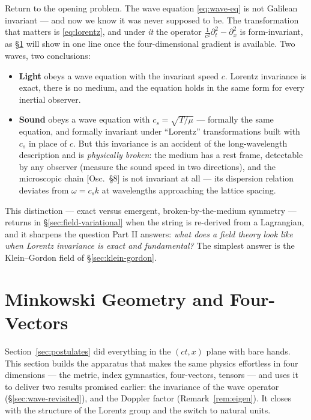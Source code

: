 \documentclass[11pt]{article}
\theoremstyle{plain}
\theoremstyle{definition}
\theoremstyle{remark}
\begin{document}
Return to the opening problem. The wave equation
\eqref{eq:wave-eq} is not Galilean invariant --- and now we know it was
never supposed to be. The transformation that matters is
\eqref{eq:lorentz}, and under \emph{it} the operator
$\frac{1}{c^2}\partial_t^2 - \partial_x^2$ is form-invariant, as
\S\ref{sec:minkowski} will show in one line once the four-dimensional
gradient is available. Two waves, two conclusions:

\begin{itemize}
  \item \textbf{Light} obeys a wave equation with the invariant speed
  $c$. Lorentz invariance is exact, there is no medium, and the equation
  holds in the same form for every inertial observer.
  \item \textbf{Sound} obeys a wave equation with $c_s = \sqrt{T/\mu}$
  --- formally the same equation, and formally invariant under
  ``Lorentz'' transformations built with $c_s$ in place of $c$. But this
  invariance is an accident of the long-wavelength description and is
  \emph{physically broken}: the medium has a rest frame, detectable by
  any observer (measure the sound speed in two directions), and the
  microscopic chain [Osc.\ \S8] is not invariant at all --- its
  dispersion relation deviates from $\omega = c_s k$ at wavelengths
  approaching the lattice spacing.
\end{itemize}

\noindent
This distinction --- exact versus emergent, broken-by-the-medium symmetry
--- returns in \S\ref{sec:field-variational} when the string is
re-derived from a Lagrangian, and it sharpens the question Part II
answers: \emph{what does a field theory look like when Lorentz invariance
is exact and fundamental?} The simplest answer is the
Klein--Gordon field of \S\ref{sec:klein-gordon}.

\section{Minkowski Geometry and Four-Vectors}
\label{sec:minkowski}

Section~\ref{sec:postulates} did everything in the $(ct, x)$ plane with
bare hands. This section builds the apparatus that makes the same
physics effortless in four dimensions --- the metric, index gymnastics,
four-vectors, tensors --- and uses it to deliver two results promised
earlier: the invariance
of the wave operator (\S\ref{sec:wave-revisited}), and the
Doppler factor (Remark~\ref{rem:eigen}). It closes with the
structure of the Lorentz group and the switch to natural units.
\end{document}
